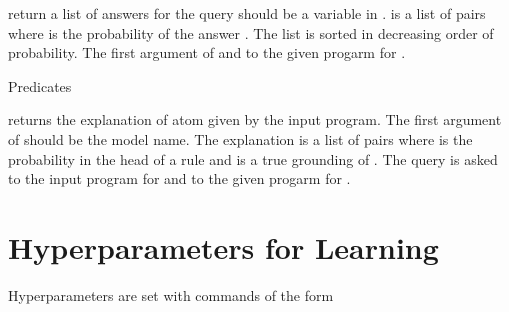 \documentclass[letterpaper,10pt,english]{sphinxmanual}
\begin{document}
\sphinxAtStartPar
return a list of answers for the query  should be a variable in .  is a list of pairs
 where  is the probability of the answer .
The list is sorted in decreasing order of probability.
The first argument of  and to the
given progarm for .

\sphinxAtStartPar
Predicates

\begin{sphinxVerbatim}[commandchars=\\\{\}]
        
  
\end{sphinxVerbatim}

\sphinxAtStartPar
returns the explanation of atom  given by the
input program. The first argument of  should be the model name.
The explanation is a list of pairs  where  is the probability
in the head of a rule  and  is a true grounding of .
The query is asked to the input program for  and to the
given progarm for .


\section{Hyper\sphinxhyphen{}parameters for Learning}
\label{\detokenize{index:hyper-parameters-for-learning}}
\sphinxAtStartPar
Hyper\sphinxhyphen{}parameters are set with commands of the form
\end{document}
